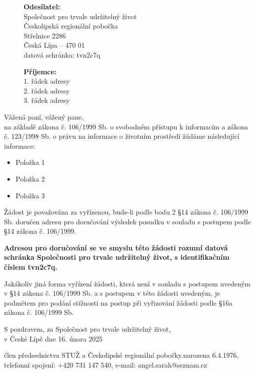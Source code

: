 \documentclass{stuz}
\newcommand{\from}{\textbf{Odesílatel:}\\
	Společnost pro trvale udržitelný život\\
	Českolipská regionální pobočka\\
	Střelnice 2286\\
	Česká Lípa – 470 01\\
	datová schránka: tvn2c7q\\}
\newcommand{\toaddress}{\textbf{Příjemce:}\\
	1. řádek adresy\\
	2. řádek adresy\\
	3. řádek adresy
}
\begin{document}

	\noindent
	\begin{figure}[H]
		\begin{minipage}[t]{.5\textwidth}
			\from
		\end{minipage}%
		\begin{minipage}[t]{.5\textwidth}
			\toaddress
		\end{minipage}
	\end{figure}
	
	\begin{spacing}{1.25} %
		\noindent
		\vspace{1cm}
		
		Vážená paní, vážený pane,
		\\
		na základě zákona č. 106/1999 Sb. o svobodném přístupu k informacím a zákona č.	123/1998 Sb. o právu na informace o životním prostředí žádáme následující informace:
			
		\begin{itemize}
			\item Položka 1
            \item Položka 2
            \item Položka 3
		\end{itemize}
		\clearpage
		
		Žádost je považována za vyřízenou, bude-li podle bodu 2 §14 zákona č. 106/1999 Sb. doručen adresu pro doručování výsledek posudku v souladu s postupem podle §14 zákona č. 106/1999.
		
		\textbf{Adresou pro doručování se ve smyslu této žádosti rozumí datová schránka Společnosti pro trvale udržitelný život, s identifikačním číslem tvn2c7q.}
		
		Jakákoliv jiná forma vyřízení žádosti, která není v souladu s postupem uvedeným v §14
		zákona č. 106/1999 Sb. a s postupem v této žádosti uvedeným, je podmětem pro podání
		stížnosti na postup při vyřizování žádosti podle §16a zákona č. 106/1999 Sb.
		
		\vspace{\vfill}
		\noindent
		S pozdravem, za Společnost pro trvale udržitelný život,\\
		v České Lípě dne 16. února 2025
		\\
		\signature{Karolína Daňková}{člen předsednictva STUŽ a Českolipské regionální pobočky.}{narozena 6.4.1976, telefonní spojení: +420 731 147 540, e-mail: angel.sarah@seznam.cz}
		\noindent
	\end{spacing}
	
	
\end{document}
